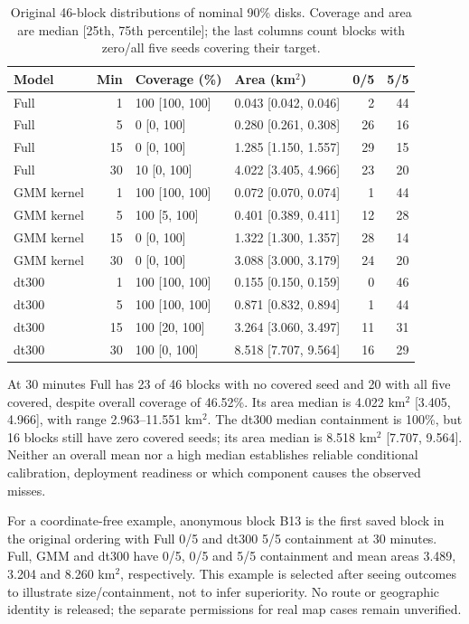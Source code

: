 \documentclass[11pt]{article}
\begin{document}
\begin{table}[htbp]
\centering\small
\caption{Original 46-block distributions of nominal 90\% disks.
Coverage and area are median [25th, 75th percentile]; the last columns
count blocks with zero/all five seeds covering their target.}
\label{tab:block-calibration}
\begin{tabular}{@{}lrl lrr@{}}
\toprule
Model & Min & Coverage (\%) & Area (km$^2$) & 0/5 & 5/5\\
\midrule
Full & 1 & 100 [100, 100] & 0.043 [0.042, 0.046] & 2 & 44\\
Full & 5 & 0 [0, 100] & 0.280 [0.261, 0.308] & 26 & 16\\
Full & 15 & 0 [0, 100] & 1.285 [1.150, 1.557] & 29 & 15\\
Full & 30 & 10 [0, 100] & 4.022 [3.405, 4.966] & 23 & 20\\
\midrule
GMM kernel & 1 & 100 [100, 100] & 0.072 [0.070, 0.074] & 1 & 44\\
GMM kernel & 5 & 100 [5, 100] & 0.401 [0.389, 0.411] & 12 & 28\\
GMM kernel & 15 & 0 [0, 100] & 1.322 [1.300, 1.357] & 28 & 14\\
GMM kernel & 30 & 0 [0, 100] & 3.088 [3.000, 3.179] & 24 & 20\\
\midrule
dt300 & 1 & 100 [100, 100] & 0.155 [0.150, 0.159] & 0 & 46\\
dt300 & 5 & 100 [100, 100] & 0.871 [0.832, 0.894] & 1 & 44\\
dt300 & 15 & 100 [20, 100] & 3.264 [3.060, 3.497] & 11 & 31\\
dt300 & 30 & 100 [0, 100] & 8.518 [7.707, 9.564] & 16 & 29\\
\bottomrule
\end{tabular}
\end{table}

At 30 minutes Full has 23 of 46 blocks with no covered seed and 20 with
all five covered, despite overall coverage of 46.52\%. Its area median is
4.022 km$^2$ [3.405, 4.966], with range 2.963--11.551 km$^2$.
The dt300 median containment is 100\%, but 16 blocks still have zero
covered seeds; its area median is 8.518 km$^2$ [7.707, 9.564].
Neither an overall mean nor a high median establishes reliable
conditional calibration, deployment readiness or which component causes
the observed misses.

For a coordinate-free example, anonymous block B13 is the first saved
block in the original ordering with Full 0/5 and dt300 5/5 containment
at 30 minutes. Full, GMM and dt300 have 0/5, 0/5 and 5/5 containment
and mean areas 3.489, 3.204 and 8.260 km$^2$, respectively. This example
is selected after seeing outcomes to illustrate size/containment, not
to infer superiority. No route or geographic identity is released;
the separate permissions for real map cases remain unverified.
\end{document}
